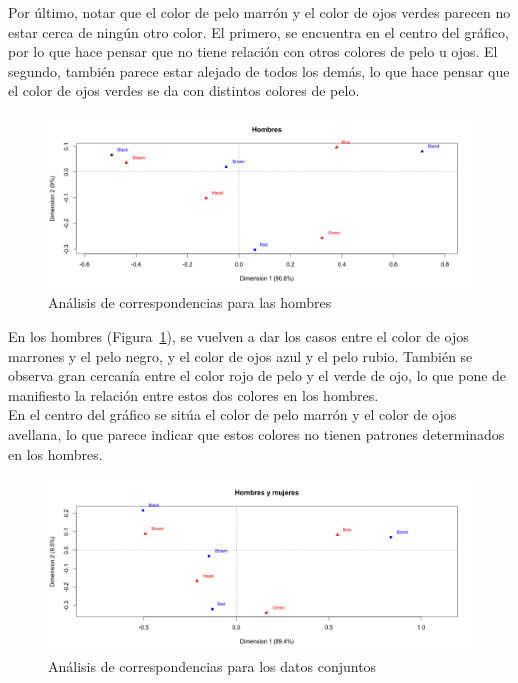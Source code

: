 \documentclass[12pt,a4paper,twoside,openright,titlepage,final]{article}
\begin{document}
Por último, notar que el color de pelo marrón y el color de ojos verdes parecen no estar cerca de ningún otro color. El primero, se encuentra en el centro del gráfico, por lo que hace pensar que no tiene relación con otros colores de pelo u ojos. El segundo, también parece estar alejado de todos los demás, lo que hace pensar que el color de ojos verdes se da con distintos colores de pelo.\\

\begin{figure}[tbph!]
\centering
\includegraphics[width=\linewidth]{imagenes/hombres_ca}
\caption{Análisis de correspondencias para las hombres}
\label{fig:hombres_ca}
\end{figure}

En los hombres (Figura~\ref{fig:hombres_ca}), se vuelven a dar los casos entre el color de ojos marrones y el pelo negro, y el color de ojos azul y  el pelo rubio. También se observa gran cercanía entre el color rojo de pelo y el verde de ojo, lo que pone de manifiesto la relación entre estos dos colores en los hombres.\\

En el centro del gráfico se sitúa el color de pelo marrón y el color de ojos avellana, lo que parece indicar que estos colores no tienen patrones determinados en los hombres.\\ 

\begin{figure}[tbph!]
\centering
\includegraphics[width=\linewidth]{imagenes/global_ca}
\caption{Análisis de correspondencias para los datos conjuntos}
\label{fig:global_ca}
\end{figure}
\end{document}
